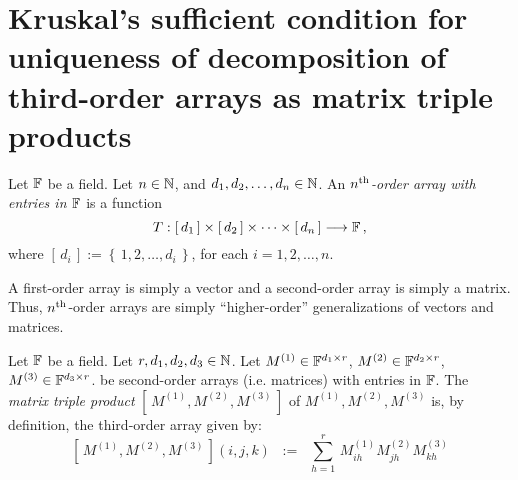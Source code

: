 

\section{Kruskal's sufficient condition for uniqueness of decomposition of third-order arrays as matrix triple products}
\setcounter{theorem}{0}
\setcounter{equation}{0}

\renewcommand{\theenumi}{\roman{enumi}}
\renewcommand{\labelenumi}{\textnormal{(\theenumi)}$\;\;$}

\begin{definition}
\label{nThOrderArray}
\mbox{}\vskip 0.05cm
\noindent
Let $\mathbb{F}$ be a field. Let $n \in \mathbb{N}$, and $d_{1}, d_{2}, \ldots, d_{n} \in \mathbb{N}$.
An \emph{$n^{\textnormal{th}}$-order array with entries in $\mathbb{F}$} is a function
\begin{equation*}
T : \left[\,d_{1}\,\right] \times \left[\,d_{2}\,\right] \times \cdots \times \left[\,d_{n}\,\right] \longrightarrow \mathbb{F}\,,
\end{equation*}
where $\left[\,d_{i}\,\right] := \left\{\,1,2,\ldots,d_{i}\,\right\}$, for each $i = 1,2,\ldots, n$.
\end{definition}

\begin{remark}
\mbox{}\vskip 0.05cm
\noindent
A first-order array is simply a vector and a second-order array is simply a matrix.
Thus, $n^{\textnormal{th}}$-order arrays are simply ``higher-order'' generalizations of vectors and matrices. 
\end{remark}

\begin{definition}
\label{MatrixTripleProduct}
\mbox{}\vskip 0.05cm
\noindent
Let $\mathbb{F}$ be a field.
Let $r, d_{1}, d_{2}, d_{3} \in \mathbb{N}$.
Let $M^{(1)} \in \mathbb{F}^{d_{1} \times r}$, $M^{(2)} \in \mathbb{F}^{d_{2} \times r}$, $M^{(3)} \in \mathbb{F}^{d_{3} \times r}$.
be second-order arrays (i.e. matrices) with entries in $\mathbb{F}$.
The \emph{matrix triple product} $\left[\,M^{(1)},M^{(2)},M^{(3)}\,\right]$ of $M^{(1)}, M^{(2)}, M^{(3)}$
is, by definition, the third-order array given by:
\begin{equation*}
\left[\,M^{(1)},M^{(2)},M^{(3)}\,\right](i,j,k)
\;\; := \;\;
\sum_{h = 1}^{r}\, M^{(1)}_{ih} M^{(2)}_{jh} M^{(3)}_{kh}
\end{equation*}
\end{definition}

